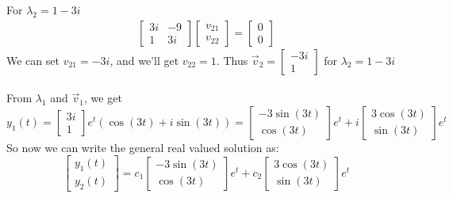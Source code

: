 \documentclass[12pt]{article}
\begin{document}
For $\lambda_2 = 1 -3i$
\begin{align*}
\begin{bmatrix}
3i & -9 \\ 1 & 3i
\end{bmatrix}
\begin{bmatrix}
v_{21} \\ v_{22}
\end{bmatrix}
= 
\begin{bmatrix}
0 \\ 0
\end{bmatrix}
\end{align*} 
We can set $v_{21} = -3i$, and we'll get $v_{22} = 1$. Thus $\vec{v}_2 = \begin{bmatrix} -3i \\ 1	\end{bmatrix}$ for $\lambda_2 = 1 - 3i$
\\ \\ 
From $\lambda_1$ and $\vec{v}_1$, we get 
$$
y_1(t) = 
\begin{bmatrix}
3i \\ 1
\end{bmatrix}e^t \left(\cos(3t) + i\sin(3t)\right) = 
\begin{bmatrix}
	-3\sin(3t) \\
	\cos(3t)
\end{bmatrix}e^t +
i \begin{bmatrix}
	3\cos(3t) \\
	\sin(3t)
\end{bmatrix}e^t
$$
So now we can write the general real valued solution as:
$$
\begin{bmatrix} y_1(t) \\ y_2(t) \end{bmatrix} =
c_1 \begin{bmatrix}
		-3\sin(3t) \\
		\cos(3t)
	\end{bmatrix}e^t +
c_2 \begin{bmatrix}
		3\cos(3t) \\
		\sin(3t)
	\end{bmatrix}e^t
$$

\newpage 
\end{document}
